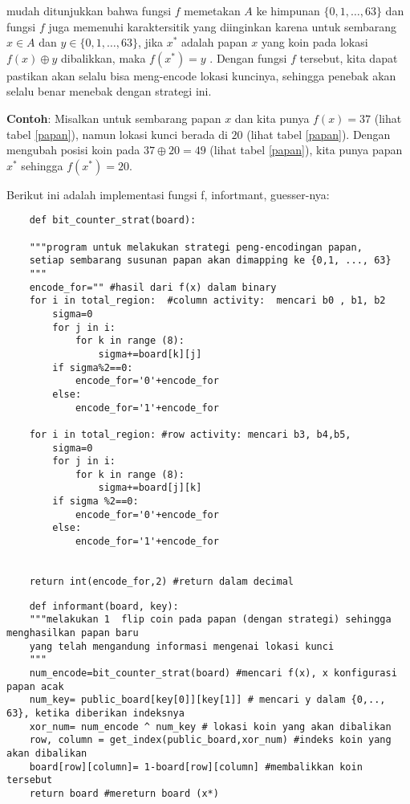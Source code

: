 \documentclass[12pt,letterpaper]{article}
\begin{document}
mudah ditunjukkan bahwa fungsi $f$ memetakan $A$ ke himpunan $\{0,1,\dots, 63\}$ dan fungsi $f$ juga memenuhi
karaktersitik yang diinginkan karena untuk sembarang $x\in A$ dan $y\in \{0,1,\dots, 63\}$, jika $x^{*}$ adalah
papan $x$ yang koin pada lokasi $f(x) \oplus y$ dibalikkan, maka $f(x^{*})=y$
. Dengan fungsi $f$ tersebut, kita dapat pastikan akan selalu bisa meng-encode lokasi kuncinya,
sehingga penebak akan selalu benar menebak dengan strategi ini.

\textbf{Contoh}: Misalkan untuk sembarang papan $x$ dan kita punya $f(x)=37$ (lihat tabel \ref{papan}), namun lokasi kunci berada di $20$ (lihat tabel \ref{papan}).
Dengan mengubah posisi koin pada $37 \oplus 20 = 49 $ (lihat tabel \ref{papan}), kita punya papan $x^{*}$ sehingga $f(x^{*})=20$.

Berikut ini adalah implementasi fungsi f, infortmant, guesser-nya:

\begin{lstlisting}
    def bit_counter_strat(board):

    """program untuk melakukan strategi peng-encodingan papan,
    setiap sembarang susunan papan akan dimapping ke {0,1, ..., 63}
    """
    encode_for="" #hasil dari f(x) dalam binary
    for i in total_region:  #column activity:  mencari b0 , b1, b2
        sigma=0
        for j in i:
            for k in range (8):
                sigma+=board[k][j]
        if sigma%2==0:
            encode_for='0'+encode_for
        else:
            encode_for='1'+encode_for
    
    for i in total_region: #row activity: mencari b3, b4,b5,
        sigma=0
        for j in i:
            for k in range (8):
                sigma+=board[j][k]
        if sigma %2==0:
            encode_for='0'+encode_for
        else:
            encode_for='1'+encode_for

    
    return int(encode_for,2) #return dalam decimal

\end{lstlisting}
\begin{lstlisting}
    def informant(board, key):
    """melakukan 1  flip coin pada papan (dengan strategi) sehingga menghasilkan papan baru
    yang telah mengandung informasi mengenai lokasi kunci
    """
    num_encode=bit_counter_strat(board) #mencari f(x), x konfigurasi papan acak
    num_key= public_board[key[0]][key[1]] # mencari y dalam {0,.., 63}, ketika diberikan indeksnya
    xor_num= num_encode ^ num_key # lokasi koin yang akan dibalikan
    row, column = get_index(public_board,xor_num) #indeks koin yang akan dibalikan
    board[row][column]= 1-board[row][column] #membalikkan koin tersebut
    return board #mereturn board (x*)

\end{lstlisting}
\end{document}
